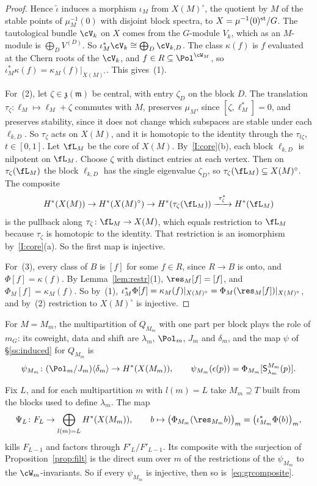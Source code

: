 \documentclass[11pt]{amsart}
\begin{document}
\begin{proof}
Hence $\tilde\iota$ induces a morphism $\iota_M$ from $X(M)^\circ$, the
quotient by $M$ of the stable points of $\mu_M^{-1}(0)$ with disjoint block
spectra, to $X=\mu^{-1}(0)^{\rm st}/G$.  The tautological bundle $\cV_k$ on $X$
comes from the $G$-module $V_k$, which as an $M$-module is
$\bigoplus_DV^{(D)}$.  So $\iota_M^*\cV_k\cong\bigoplus_D\cV_{k,D}$.  The class
$\kappa(f)$ is $f$ evaluated at the Chern roots of the $\cV_k$, and $f\in
R\subseteq\Pol^{\cW_M}$, so $\iota_M^*\kappa(f)=\kappa_M(f)|_{X(M)^\circ}$.  This
gives~(1).

For~(2), let $\zeta\in\mathfrak z(\mathfrak m)$ be central, with entry
$\zeta_D$ on the block $D$.  The translation $\tau_\zeta\colon\ell_M\mapsto\ell_M+\zeta$
commutes with $M$, preserves $\mu_M$, since $[\zeta,\ell_M^*]=0$, and
preserves stability, since it does not change which subspaces are stable
under each $\ell_{k,D}$.  So $\tau_\zeta$ acts on $X(M)$, and it is homotopic to
the identity through the $\tau_{t\zeta}$, $t\in[0,1]$.  Let $\fL_M$ be the core
of $X(M)$.  By~\ref{I:core}(b), each block $\ell_{k,D}$ is nilpotent on
$\fL_M$.  Choose $\zeta$ with distinct entries at each vertex.  Then on
$\tau_\zeta(\fL_M)$ the block $\ell_{k,D}$ has the single eigenvalue $\zeta_D$,
so $\tau_\zeta(\fL_M)\subseteq X(M)^\circ$.  The composite
\[
 H^*(X(M))\to H^*(X(M)^\circ)\to H^*(\tau_\zeta(\fL_M))
 \xrightarrow{\ \tau_\zeta^*\ }H^*(\fL_M)
\]
is the pullback along $\tau_\zeta\colon\fL_M\to X(M)$, which equals restriction
to $\fL_M$ because $\tau_\zeta$ is homotopic to the identity.  That restriction is
an isomorphism by~\ref{I:core}(a).  So the first map is injective.

For~(3), every class of $B$ is $[f]$ for some $f\in R$, since $R\to B$ is
onto, and $\Phi[f]=\kappa(f)$.  By Lemma~\ref{lem:restr}(1),
$\res_M[f]=[f]$, and $\Phi_M[f]=\kappa_M(f)$.  So by~(1),
$\iota_M^*\Phi[f]=\kappa_M(f)|_{X(M)^\circ}=\Phi_M(\res_M[f])|_{X(M)^\circ}$,
and by~(2) restriction to $X(M)^\circ$ is injective.
\end{proof}

For $M=M_m$, the multipartition of $Q_{M_m}$ with one part per block plays the
role of $m_G$: its coweight, data and shift are $\lambda_m$, $\Pol_m$, $J_m$
and $\delta_m$, and the map $\psi$ of \S\ref{ss:induced} for $Q_{M_m}$ is
\[
 \psi_{M_m}\colon(\Pol_m/J_m)\langle\delta_m\rangle\to H^*(X(M_m)),\qquad
 \psi_{M_m}(\epsilon(p))=\Phi_{M_m}[\mathsf S^{M_m}_{\lambda_m}(p)].
\]

\begin{proposition}\label{prop:detect}
Fix $L$, and for each multipartition $m$ with $l(m)=L$ take $M_m\supseteq T$
built from the blocks used to define $\lambda_m$.  The map
\[
 \Psi_L\colon F_L\to\bigoplus_{l(m)=L}H^*(X(M_m)),\qquad
 b\mapsto\big(\Phi_{M_m}(\res_{M_m}b)\big)_m=\big(\iota_{M_m}^*\Phi(b)\big)_m ,
\]
kills $F_{L-1}$ and factors through $F'_L/F'_{L-1}$.  Its composite with the
surjection of Proposition~\ref{prop:filt} is the direct sum over $m$ of the
restrictions of the $\psi_{M_m}$ to the $\cW_m$-invariants.  So if every
$\psi_{M_m}$ is injective, then so is~\eqref{eq:grcomposite}.
\end{proposition}
\end{document}
